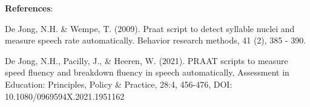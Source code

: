 \documentclass{../labbook}
\begin{document}



\bigskip
\textbf{References}:

\noindent De Jong, N.H. \& Wempe, T. (2009). Praat script to detect syllable nuclei and measure speech rate automatically. Behavior research methods, 41 (2), 385 - 390. 

De Jong, N.H., Pacilly, J., \& Heeren, W. (2021). PRAAT scripts to measure speed fluency and breakdown fluency in speech automatically, Assessment in Education: Principles, Policy \& Practice, 28:4, 456-476, DOI: 10.1080/0969594X.2021.1951162 
\end{document}
